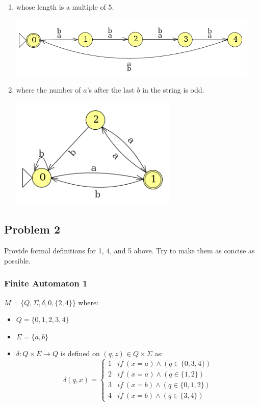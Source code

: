 \documentclass[letterpaper, 12pt]{math}
\begin{document}
\begin{enumerate}
\begin{center}
    \end{center}
  \item whose length is a multiple of 5.
    \begin{center}
      \includegraphics[width=12cm]{assets/hw_2_1_4.png}
    \end{center}
  \item where the number of \( a \)'s after the last \( b \) in the string is
    odd.
    \begin{center}
      \includegraphics[width=8cm]{assets/hw_2_1_5.png}
    \end{center}
\end{enumerate}

\subsection*{Problem 2}
Provide formal definitions for 1, 4, and 5 above. Try to make them as concise
as possible.

\subsubsection*{Finite Automaton 1}
\( M = \{Q,\Sigma,\delta,0,\{2,4\}\} \) where:
\begin{itemize}
  \item \( Q = \{0,1,2,3,4\} \)
  \item \( \Sigma = \{a,b\} \)
  \item \( \delta: Q\times E\to Q \) is defined on \( (q,z)\in Q\times\Sigma \) as:
    \[ \delta(q,x) = \begin{cases}
      1 & if\ (x = a) \wedge (q\in\{0,3,4\}) \\
      2 & if\ (x = a) \wedge (q\in\{1,2\})   \\
      3 & if\ (x = b) \wedge (q\in\{0,1,2\}) \\
      4 & if\ (x = b) \wedge (q\in\{3,4\})
    \end{cases} \]
\end{itemize}
\end{document}
